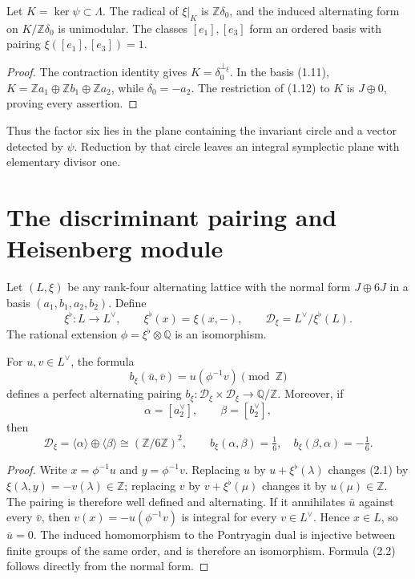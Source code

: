 \documentclass[11pt]{article}
\numberwithin{equation}{section}
\begin{document}
\begin{proposition}\label{prop:reduction}
Let $K=\ker\psi\subset\Lambda$.  The radical of $\xi|_K$ is
$\mathbb Z\delta_0$, and the induced alternating form on
$K/\mathbb Z\delta_0$ is unimodular.  The classes $[e_1],[e_3]$
form an ordered basis with pairing $\xi([e_1],[e_3])=1$.
\end{proposition}

\begin{proof}
The contraction identity gives $K=\delta_0^{\perp_\xi}$.
In the basis (1.11), $K=\mathbb Za_1\oplus\mathbb Zb_1\oplus
\mathbb Za_2$, while $\delta_0=-a_2$.
The restriction of (1.12) to $K$ is $J\oplus0$, proving every assertion.
\end{proof}

Thus the factor six lies in the plane containing the invariant circle
and a vector detected by $\psi$.  Reduction by that circle leaves an
integral symplectic plane with elementary divisor one.

\section{The discriminant pairing and Heisenberg module}

Let $(L,\xi)$ be any rank-four alternating lattice with the normal form
$J\oplus6J$ in a basis $(a_1,b_1,a_2,b_2)$.  Define
\[
 \xi^\flat:L\longrightarrow L^\vee,\qquad \xi^\flat(x)=\xi(x,-),
 \qquad
 \mathcal D_\xi=L^\vee/\xi^\flat(L).
\]
The rational extension
$\phi=\xi^\flat\otimes\mathbb Q$ is an isomorphism.

\begin{lemma}
For $u,v\in L^\vee$, the formula
\[
 b_\xi(\bar u,\bar v)=u(\phi^{-1}v)\pmod{\mathbb Z}               \tag{2.1}
\]
defines a perfect alternating pairing
$b_\xi:\mathcal D_\xi\times\mathcal D_\xi\to\mathbb Q/\mathbb Z$.
Moreover, if
\[
 \alpha=[a_2^\vee],\qquad \beta=[b_2^\vee],
\]
then
\[
 \mathcal D_\xi=\langle\alpha\rangle\oplus\langle\beta\rangle
 \cong(\mathbb Z/6\mathbb Z)^2,\qquad
 b_\xi(\alpha,\beta)=\tfrac16,\quad
 b_\xi(\beta,\alpha)=-\tfrac16.                                  \tag{2.2}
\]
\end{lemma}

\begin{proof}
Write $x=\phi^{-1}u$ and $y=\phi^{-1}v$.  Replacing $u$ by
$u+\xi^\flat(\lambda)$ changes (2.1) by
$\xi(\lambda,y)=-v(\lambda)\in\mathbb Z$; replacing $v$ by
$v+\xi^\flat(\mu)$ changes it by $u(\mu)\in\mathbb Z$.  The pairing is
therefore well defined and alternating.  If it annihilates $\bar u$ against
every $\bar v$, then $v(x)=-u(\phi^{-1}v)$ is integral for every
$v\in L^\vee$.  Hence $x\in L$, so $\bar u=0$.  The induced homomorphism
to the Pontryagin dual is injective between finite groups of the same order,
and is therefore an isomorphism.  Formula (2.2) follows directly from the
normal form.
\end{proof}
\end{document}
